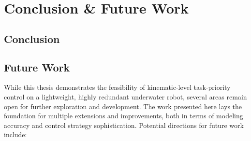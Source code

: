 \chapter{Conclusion \& Future Work}
\label{ch:conclusion}

\section{Conclusion}

\section{Future Work}
\label{sec:conclusion:future_work}

While this thesis demonstrates the feasibility of kinematic-level task-priority control on a lightweight, highly redundant underwater robot, several areas remain open for further exploration and development. The work presented here lays the foundation for multiple extensions and improvements, both in terms of modeling accuracy and control strategy sophistication. Potential directions for future work include:

